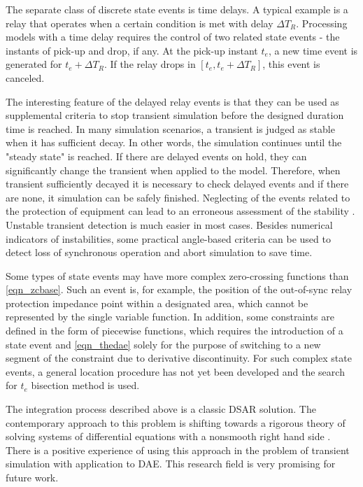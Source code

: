 \documentclass[lettersize,journal]{IEEEtran}
\begin{document}
The separate class of discrete state events is time delays. A typical example is a relay that operates when a certain condition is met with delay \(\Delta T_R\). Processing models with a time delay requires the control of two related state events - the instants of pick-up and drop, if any. At the pick-up instant \(t_e\), a new time event is generated for \(t_e+\Delta T_R\). If the relay drops in \(\left[t_e, t_e+\Delta T_R \right]\), this event is canceled.

The interesting feature of the delayed relay events is that they can be used as supplemental criteria to stop transient simulation before the designed duration time is reached. In many simulation scenarios, a transient is judged as stable when it has sufficient decay. In other words, the simulation continues until the "steady state" is reached. If there are delayed events on hold, they can significantly change the transient when applied to the model. Therefore, when transient sufficiently decayed it is necessary to check delayed events and if there are none, it simulation can be safely finished. Neglecting of the events related to the protection of equipment can lead to an erroneous assessment of the stability \cite{VanCutsem2020}. Unstable transient detection is much easier in most cases. Besides numerical indicators of instabilities, some practical angle-based criteria can be used to detect loss of synchronous operation and abort simulation to save time.

Some types of state events may have more complex zero-crossing functions than \eqref{eqn_zcbase}. Such an event is, for example, the position of the out-of-sync relay protection impedance point within a designated area, which cannot be represented by the single variable function. In addition, some constraints are defined in the form of piecewise functions, which requires the introduction of a state event and \eqref{eqn_thedae} solely for the purpose of switching to a new segment of the constraint due to derivative discontinuity. For such complex state events, a general location procedure has not yet been developed and the search for \(t_e\) bisection method is used.

The integration process described above is a classic DSAR solution. The contemporary approach to this problem is shifting towards a rigorous theory of solving systems of differential equations with a nonsmooth right hand side \cite{Filippov1988}. There is a positive experience of using this approach in the problem of transient simulation \cite{Murad2019} with application to DAE. This research field is very promising for future work.
\end{document}
